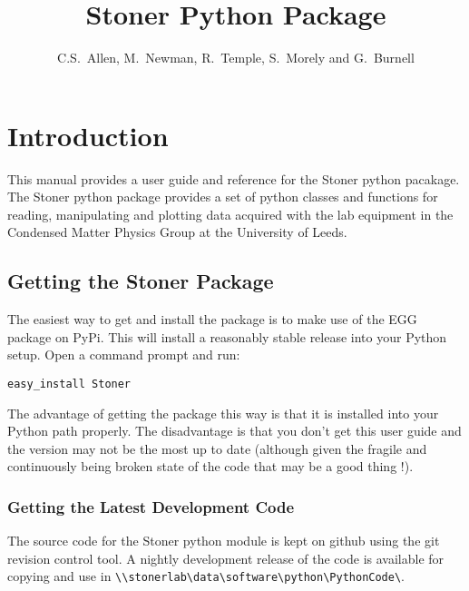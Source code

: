 \documentclass[a4paper,11pt]{scrartcl}
\author{C.S.~Allen, M.~Newman, R.~Temple, S.~Morely  and G.~Burnell}
\title{Stoner Python Package}
\begin{document}
\maketitle

\tableofcontents
\newpage
\pagestyle{scrheadings} 
\ifoot[\today]{\today}



  \section{Introduction}

This manual provides a user guide and reference for the Stoner python pacakage.
The Stoner python package provides a set of python classes and functions for
reading, manipulating and plotting data acquired with the lab equipment in the
Condensed Matter Physics Group at the University of Leeds.

\subsection{Getting the Stoner Package}

The easiest way to get and install the package is to make use of the EGG
package on PyPi. This will install a reasonably stable release into your
Python setup. Open a command prompt and run:

\begin{verbatim}
easy_install Stoner
\end{verbatim}

The advantage of getting the package this way is that it is installed into your Python path properly.
The disadvantage is that you don't get this user guide and the version may not be the most
up to date (although given the fragile and continuously being broken state of the code that may be
a good thing !).

\subsubsection{Getting the Latest Development Code}


The source code for the Stoner python module is kept on github using the git
revision control tool. A nightly development release of the code is available for copying and
use in \verb#\\stonerlab\data\software\python\PythonCode\#.
\end{document}
